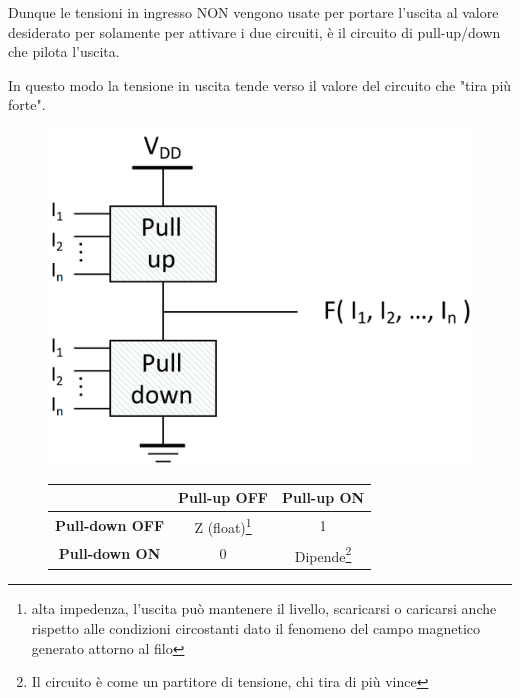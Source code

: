 Dunque le tensioni in ingresso NON vengono usate per portare l'uscita al valore desiderato per solamente per attivare i due circuiti, è il circuito di pull-up/down che pilota l'uscita.

In questo modo la tensione in uscita tende verso il valore del circuito che "tira più forte".


\begin{figure}[htbp]
    \begin{minipage}[htbp]{0.5\textwidth}
    \centering
        \includegraphics[width=0.6\linewidth]{img/pull_u_d.png}   
    \end{minipage}
    \begin{minipage}[htbp]{0.5\textwidth}
    \centering

    \begin{tabular}{c|c c}
             & \textbf{Pull-up OFF} & \textbf{Pull-up ON} \\
             \hline
        \textbf{Pull-down OFF} & Z (float)\footnote{alta impedenza, l'uscita può mantenere il livello, scaricarsi o caricarsi anche rispetto alle condizioni circostanti dato il fenomeno del campo magnetico generato attorno al filo} & 1 \\
        
        \textbf{Pull-down ON} & 0 & Dipende\footnote{Il circuito è come un partitore di tensione, chi tira di più vince} \\
    \end{tabular}
    
    \end{minipage}
\end{figure}


    

